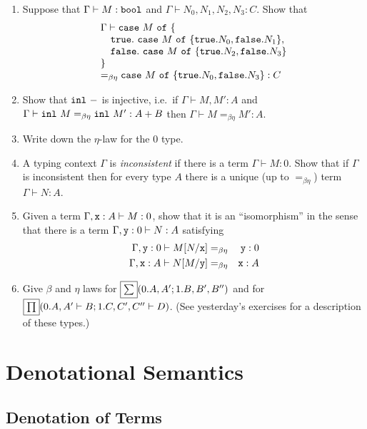 \documentclass[runningheads,12pt]{llncs}
\newcommand{\leftconn}{\framebox{$\tesum$}}
\newcommand{\rightconn}{\framebox{$\teprod$}}
\newcommand{\eqbe}{=_{\beta\eta}}
\begin{document}
\begin{enumerate}
\item Suppose that $\Gamma \vdash M : \mathtt{bool}$ and $\Gamma \vdash N_{0}, N_{1},
  N_{2}, N_{3} : C$.  Show that
\begin{displaymath}
  \begin{array}{l}
  \Gamma \vdash \ttcase M \ttof  \{  \\\betwixt \tttrue.\ \ttcase M \ttof \{\tttrue. N_{0}, \ttfalse.N_{1} \}, \\ \betwixt\ttfalse.\ \ttcase M \ttof \{\tttrue. N_{2}, \ttfalse.N_{3} \} \\ \}  \\
 \eqbe \ttcase M \ttof \{ \tttrue. N_{0}, \ttfalse. N_{3} \} : C
\end{array}
\end{displaymath}
\item Show that $\mathtt{inl} \  {-}$ is injective, i.e.\ if $\Gamma \vdash M, M' : A$ and $\Gamma
\vdash \tttagl{M} \eqbe \tttagl{M'} : A + B$ then $\Gamma \vdash M \eqbe M' : A$.
\item Write down the $\eta$-law for the $0$ type.
\item A typing context $\Gamma$ is \emph{inconsistent} if there is a term $\Gamma \vdash M : 0$.  Show that if $\Gamma$ is inconsistent then for every type $A$ there is a unique (up to $\eqbe$) term $\Gamma \vdash N : A$.
\item Given a term $\Gamma, \mathtt{x}:A \vdash M : 0$, show that it is an ``isomorphism'' in the sense that there is a term $\Gamma, \mathtt{y} : 0 \vdash N : A$ satisfying
  \begin{eqnarray*}
    \Gamma, \tty : 0 \vdash M[N / \ttx] & \eqbe & \tty : 0 \\
    \Gamma, \ttx: A \vdash N[M / \tty] & \eqbe & \ttx : A
  \end{eqnarray*}
\item Give $\beta$ and $\eta$ laws for $\leftconn(0.A,A';1.B,B',B'')$ and for $\rightconn(0.A,A' \vdash B; 1.C,C',C'' \vdash D)$.  (See yesterday's exercises for a description of these types.)
\end{enumerate}


\section{Denotational Semantics}
\subsection{Denotation of Terms}
\end{document}
